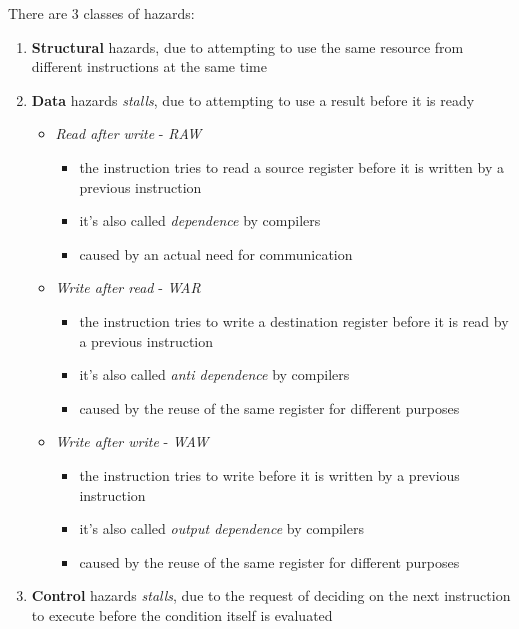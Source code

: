 \documentclass[english]{article}
\begin{document}
There are \(3\) classes of hazards:
\begin{enumerate}
  \item \textbf{Structural} hazards, due to attempting to use the same resource from different instructions at the same time
  \item \textbf{Data} hazards \textit{stalls}, due to attempting to use a result before it is ready
        \begin{itemize}
          \item \textit{Read after write} - \textit{RAW}
                \begin{itemize}[label=\(\rightarrow\)]
                  \item the instruction tries to read a source register before it is written by a previous instruction
                  \item it's also called \textit{dependence} by compilers
                  \item caused by an actual need for communication
                \end{itemize}
          \item \textit{Write after read} - \textit{WAR}
                \begin{itemize}[label=\(\rightarrow\)]
                  \item the instruction tries to write a destination register before it is read by a previous instruction
                  \item it's also called \textit{anti dependence} by compilers
                  \item caused by the reuse of the same register for different purposes
                \end{itemize}
          \item \textit{Write after write} - \textit{WAW}
                \begin{itemize}[label=\(\rightarrow\)]
                  \item the instruction tries to write before it is written by a previous instruction
                  \item it's also called \textit{output dependence} by compilers
                  \item caused by the reuse of the same register for different purposes
                \end{itemize}
        \end{itemize}
  \item \textbf{Control} hazards \textit{stalls}, due to the request of deciding on the next instruction to execute before the condition itself is evaluated
\end{enumerate}
\end{document}
